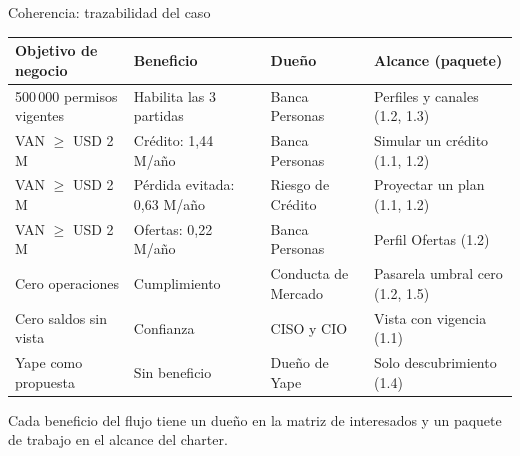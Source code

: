 \documentclass[aspectratio=169,11pt]{beamer}
\begin{document}
\begin{frame}{Coherencia: trazabilidad del caso}
\vspace{0.02cm}
\begin{center}
\scriptsize
\begin{tabular}{p{3.1cm}p{3.1cm}p{2.7cm}p{3.7cm}}
\toprule
\textbf{Objetivo de negocio} & \textbf{Beneficio} & \textbf{Dueño} & \textbf{Alcance (paquete)} \\
\midrule
500\,000 permisos vigentes & Habilita las 3 partidas & Banca Personas & Perfiles y canales (1.2, 1.3) \\
VAN $\geq$ USD 2 M & Crédito: 1,44 M/año & Banca Personas & Simular un crédito (1.1, 1.2) \\
VAN $\geq$ USD 2 M & Pérdida evitada: 0,63 M/año & Riesgo de Crédito & Proyectar un plan (1.1, 1.2) \\
VAN $\geq$ USD 2 M & Ofertas: 0,22 M/año & Banca Personas & Perfil Ofertas (1.2) \\
Cero operaciones & Cumplimiento & Conducta de Mercado & Pasarela umbral cero (1.2, 1.5) \\
Cero saldos sin vista & Confianza & CISO y CIO & Vista con vigencia (1.1) \\
Yape como propuesta & Sin beneficio & Dueño de Yape & Solo descubrimiento (1.4) \\
\bottomrule
\end{tabular}
\end{center}
\vspace{0.2cm}
{\small Cada beneficio del flujo tiene un dueño en la matriz de interesados y un paquete de trabajo en el alcance del charter.}
\end{frame}
\end{document}
